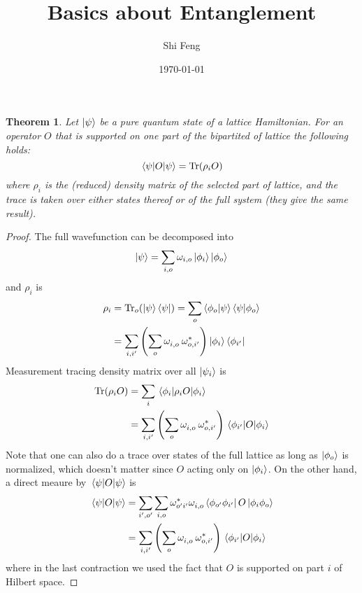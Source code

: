 \documentclass[11pt]{article}
\title{Basics about Entanglement}
\author{Shi Feng}
\date{\today}
\newtheorem{thm}{Theorem}
\theoremstyle{remark}
\theoremstyle{definition}
\begin{document}
\maketitle
\begin{thm}
	Let $\ket{\psi}$ be a pure quantum state of a lattice Hamiltonian. For an operator $O$ that is supported on one part of the bipartited of lattice the following holds: 
	\begin{equation}
		\mel{\psi}{O}{\psi} = \Tr(\rho_{i}O)
	\end{equation}
	where $\rho_{i}$ is the (reduced) density matrix of the selected part of lattice, and the trace is taken over either states thereof or of the full system (they give the same result).
\end{thm}
\begin{proof}
	The full wavefunction can be decomposed into
	\begin{equation}
		\ket{\psi} = \sum_{i,o} \omega_{i,o} \ket{\phi_i}\ket{\phi_o} 
	\end{equation}
	and $\rho_i$ is
	\begin{equation}
		\begin{split}	
			\rho_i &= \Tr_o(\ket{\psi}\bra{\psi}) = \sum_{o} \braket{\phi_o}{\psi}\braket{\psi}{\phi_o} \\
			       &=  \sum_{i,i'} \left( \sum_{o}\omega_{i,o}^{\phantom *}\:\omega_{o,i'}^* \right) \ket{\phi_i}\bra{\phi_{i'}}
		\end{split}
	\end{equation}
	Measurement tracing density matrix over all $\ket{\psi_i}$ is 
	\begin{equation}
		\begin{split}
			\Tr(\rho_i O) &= \sum_{i} \mel{\phi_i}{\rho_i O}{\phi_i}  \\
				      &= \sum_{i,i'} \left( \sum_{o} \omega_{i,o}^{\phantom *}\: \omega_{o,i'}^* \right)  \mel{\phi_{i'}}{O}{\phi_i}
		\end{split}
	\end{equation}
	Note that one can also do a trace over states of the full lattice as long as $\ket{\phi_o}$ is normalized, which doesn't matter since $O$ acting only on  $\ket{\phi_i}$.
	On the other hand, a direct meaure by $\mel{\psi}{O}{\psi}$ is 
	\begin{equation}
		\begin{split}
			\mel{\psi}{O}{\psi} &= \sum_{i',o'} \sum_{i,o} \omega_{o'i'}^* \omega_{i,o}^{\phantom *} \bra{\phi_{o'} \phi_{i'}}O\ket{\phi_i\phi_o} \\
				      &= \sum_{i,i'} \left( \sum_{o} \omega_{i,o}^{\phantom *}\: \omega_{o,i'}^* \right)  \mel{\phi_{i'}}{O}{\phi_i}
		\end{split}
	\end{equation}
	where in the last contraction we used the fact that $O$ is supported on part $i$ of Hilbert space.
\end{proof}
\end{document}
